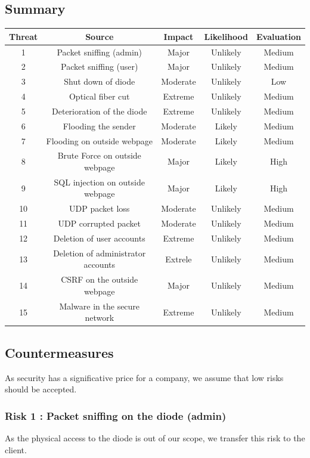 \documentclass[a4paper,11pt]{article}
\begin{document}
\subsection{Summary}
\begin{tabular}{|c|c|c|c|c|}
\hline
Threat & Source & Impact& Likelihood & Evaluation \\
\hline
1 &  Packet sniffing (admin) & Major  & Unlikely & Medium\\
\hline
2 &  Packet sniffing (user)  & Major  & Unlikely & Medium\\
\hline
3 & Shut down of diode & Moderate & Unlikely & Low \\
\hline
4 &  Optical fiber cut & Extreme  & Unlikely & Medium\\
\hline
5 & Deterioration of the diode & Extreme & Unlikely & Medium\\
\hline
6 & Flooding the sender & Moderate & Likely & Medium\\
\hline
7 & Flooding on outside webpage & Moderate & Likely & Medium \\
\hline 
8 &  Brute Force on outside webpage & Major & Likely & High\\
\hline
9 & SQL injection on outside webpage & Major & Likely & High \\
\hline
10 & UDP packet loss & Moderate & Unlikely & Medium \\
\hline
11 & UDP corrupted packet & Moderate & Unlikely & Medium \\
\hline
12 & Deletion of user accounts & Extreme & Unlikely & Medium \\
\hline
13 & Deletion of administrator accounts & Extrele & Unlikely & Medium \\
\hline
14 & CSRF on the outside webpage & Major & Unlikely & Medium \\
\hline
15 & Malware in the secure network & Extreme & Unlikely & Medium \\
\hline

  
\end{tabular}
\subsection{Countermeasures}
As security has a significative price for a company, we assume that low risks should be accepted.
\subsubsection{Risk 1 : Packet sniffing on the diode (admin) }
As the physical access to the diode is out of our scope, we transfer this risk to the client.
\end{document}
